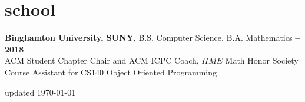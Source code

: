 \documentclass[margin,10.5pt]{res}
\begin{document}
\section{\sc \lsstyle school}
    \textbf{Binghamton University, SUNY}, B.S. Computer Science, B.A. Mathematics\hfill
    \textsc{\bfseries{} -- 2018}\\
    ACM Student Chapter Chair and ACM ICPC Coach, $\Pi ME$ Math Honor Society\\
    Course Assistant for CS140 Object Oriented Programming

\begin{minipage}[t]{\textwidth}
    \flushright
    \small
    \sc \lsstyle
    \hfill updated \today
\end{minipage}
\end{document}

